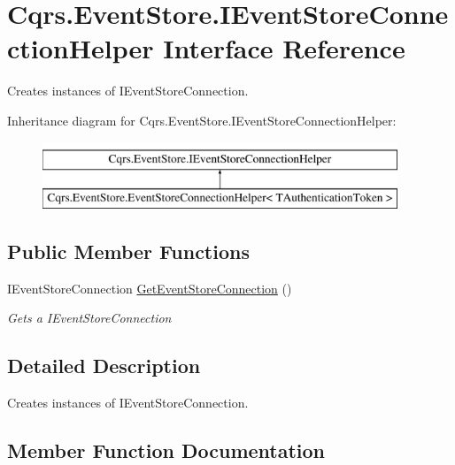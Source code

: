 \hypertarget{interfaceCqrs_1_1EventStore_1_1IEventStoreConnectionHelper}{}\section{Cqrs.\+Event\+Store.\+I\+Event\+Store\+Connection\+Helper Interface Reference}
\label{interfaceCqrs_1_1EventStore_1_1IEventStoreConnectionHelper}


Creates instances of I\+Event\+Store\+Connection.  


Inheritance diagram for Cqrs.\+Event\+Store.\+I\+Event\+Store\+Connection\+Helper\+:\begin{figure}[H]
\begin{center}
\leavevmode
\includegraphics[height=2.000000cm]{interfaceCqrs_1_1EventStore_1_1IEventStoreConnectionHelper}
\end{center}
\end{figure}
\subsection*{Public Member Functions}
\begin{DoxyCompactItemize}
\item 
I\+Event\+Store\+Connection \hyperlink{interfaceCqrs_1_1EventStore_1_1IEventStoreConnectionHelper_a7efd07573a65ace6d520d3efdb5799f3_a7efd07573a65ace6d520d3efdb5799f3}{Get\+Event\+Store\+Connection} ()
\begin{DoxyCompactList}\small\item\em Gets a I\+Event\+Store\+Connection \end{DoxyCompactList}\end{DoxyCompactItemize}


\subsection{Detailed Description}
Creates instances of I\+Event\+Store\+Connection. 



\subsection{Member Function Documentation}
\mbox{\label{interfaceCqrs_1_1EventStore_1_1IEventStoreConnectionHelper_a7efd07573a65ace6d520d3efdb5799f3_a7efd07573a65ace6d520d3efdb5799f3}} 
